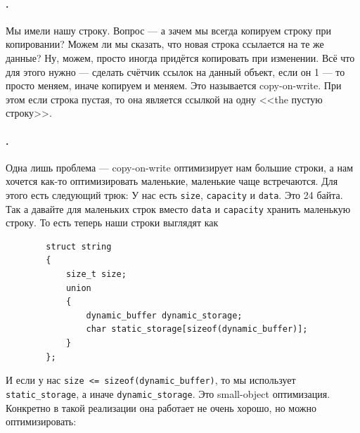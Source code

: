 \documentclass{article}
\begin{document}
    \paragraph{.}
    Мы имели нашу строку. Вопрос --- а зачем мы всегда копируем строку при копировании? Можем ли мы сказать, что новая строка ссылается на те же данные? Ну, можем, просто иногда придётся копировать при изменении. Всё что для этого нужно --- сделать счётчик ссылок на данный объект, если он 1 --- то просто меняем, иначе копируем и меняем. Это называется copy-on-write. При этом если строка пустая, то она является ссылкой на одну <<the пустую строку>>.
    \paragraph{.}
    Одна лишь проблема --- copy-on-write оптимизирует нам большие строки, а нам хочется как-то оптимизировать маленькие, маленькие чаще встречаются. Для этого есть следующий трюк: У нас есть \texttt{size}, \texttt{capacity} и \texttt{data}. Это 24 байта. Так а давайте для маленьких строк вместо \texttt{data} и \texttt{capacity} хранить маленькую строку. То есть теперь наши строки выглядят как
    \begin{verbatim}
        struct string
        {
            size_t size;
            union
            {
                dynamic_buffer dynamic_storage;
                char static_storage[sizeof(dynamic_buffer)];
            }
        };
    \end{verbatim}
    И если у нас \texttt{size <= sizeof(dynamic_buffer)}, то мы использует \texttt{static_storage}, а иначе \texttt{dynamic_storage}.
    Это small-object оптимизация. Конкретно в такой реализации она работает не очень хорошо, но можно оптимизировать:
\end{document}
